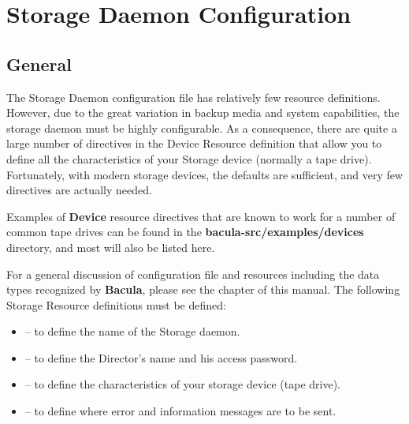 
\section*{Storage Daemon Configuration}
\label{_ChapterStart31}

\subsection*{General}

The Storage Daemon configuration file has relatively few resource definitions.
However, due to the great variation in backup media and system capabilities,
the storage daemon must be highly configurable. As a consequence, there are
quite a large number of directives in the Device Resource definition that
allow you to define all the characteristics of your Storage device (normally a
tape drive). Fortunately, with modern storage devices, the defaults are
sufficient, and very few directives are actually needed. 

Examples of {\bf Device} resource directives that are known to work for a
number of common tape drives can be found in the {\bf
\lt{}bacula-src\gt{}/examples/devices} directory, and most will also be listed
here. 

For a general discussion of configuration file and resources including the
data types recognized by {\bf Bacula}, please see the 
 chapter of this manual. The
following Storage Resource definitions must be defined: 

\begin{itemize}
\item 
    -- to define the  name of the
   Storage daemon.  
\item 
    -- to  define the Director's
   name and his access password.  
\item 
    -- to define  the
   characteristics of your storage device (tape  drive).  
\item 
    -- to define where error  and
   information messages are to be sent. 
\end{itemize}

